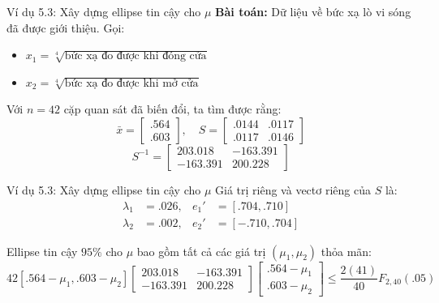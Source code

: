 \begin{frame}{Ví dụ 5.3: Xây dựng ellipse tin cậy cho $\mu$}
    \textbf{Bài toán:} Dữ liệu về bức xạ lò vi sóng đã được giới thiệu. Gọi:
    \begin{itemize}
        \item $x_1 = \sqrt[4]{\text{bức xạ đo được khi đóng cửa}}$
        \item $x_2 = \sqrt[4]{\text{bức xạ đo được khi mở cửa}}$
    \end{itemize}
    
    Với $n = 42$ cặp quan sát đã biến đổi, ta tìm được rằng:
    \[
        \bar{x} = \begin{bmatrix} .564 \\ .603 \end{bmatrix}, \quad 
        S = \begin{bmatrix} .0144 & .0117 \\ .0117 & .0146 \end{bmatrix}
    \]
    \[
        S^{-1} = \begin{bmatrix} 203.018 & -163.391 \\ -163.391 & 200.228 \end{bmatrix}
    \]
\end{frame}

\begin{frame}{Ví dụ 5.3: Xây dựng ellipse tin cậy cho $\mu$}
    Giá trị riêng và vectơ riêng của $S$ là:
    \begin{align*}
        \lambda_1 &= .026, & e_1' &= [.704, .710] \\
        \lambda_2 &= .002, & e_2' &= [-.710, .704]
    \end{align*}
    
    Ellipse tin cậy $95\%$ cho $\mu$ bao gồm tất cả các giá trị $(\mu_1, \mu_2)$ thỏa mãn:
    \[
        42 [.564 - \mu_1, .603 - \mu_2] 
        \begin{bmatrix} 203.018 & -163.391 \\ -163.391 & 200.228 \end{bmatrix}
        \begin{bmatrix} .564 - \mu_1 \\ .603 - \mu_2 \end{bmatrix} \le \frac{2(41)}{40} F_{2, 40}(.05)
    \]
\end{frame}

